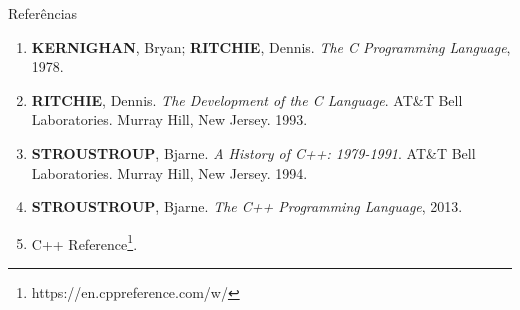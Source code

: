 \begin{frame}[fragile]{Referências}

    \begin{enumerate}
        \item \textbf{KERNIGHAN}, Bryan; \textbf{RITCHIE}, Dennis. \textit{The C Programming Language}, 1978.
        \item \textbf{RITCHIE}, Dennis. {\it The Development of the C 
        Language}. AT\&T Bell Laboratories.  Murray Hill, New Jersey. 1993.

        \item \textbf{STROUSTROUP}, Bjarne. \textit{A History of C++: 1979-1991}. 
        AT\&T Bell Laboratories.  Murray Hill, New Jersey. 1994.

        \item \textbf{STROUSTROUP}, Bjarne. \textit{The C++ Programming Language}, 2013.

		\item C++ Reference\footnote{https://en.cppreference.com/w/}.

    \end{enumerate}

\end{frame}
